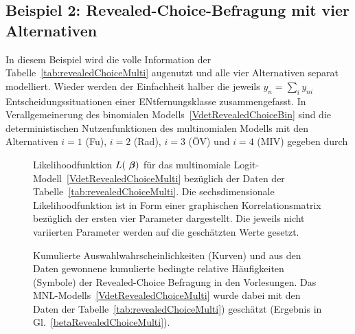 \subsection{\label{sec:revealedChoiceMulti}Beispiel 2:
  Revealed-Choice-Befragung mit vier Alternativen}

In diesem Beispiel wird die volle Information der
Tabelle~\ref{tab:revealedChoiceMulti} augenutzt und alle vier
Alternativen separat modelliert. Wieder werden der Einfachheit halber
die jeweils $y_n=\sum_i y_{ni}$ Entscheidungssituationen einer
ENtfernungsklasse zusammengefasst.
In Verallgemeinerung des binomialen Modells~\eqref{VdetRevealedChoiceBin}
sind die deterministischen Nutzenfunktionen des multinomialen Modells
mit den Alternativen $i=1$ (Fu\3), $i=2$ (Rad), $i=3$ (\"OV) und $i=4$
(MIV) gegeben durch

\begin{figure}
\caption{\label{fig:revealedChoiceMulti-L}Likelihoodfunktion $L({\mbox{ \boldmath {$\beta$}}})$
  f\"ur das multinomiale Logit-Modell~\eqref{VdetRevealedChoiceMulti} bez\"uglich
  der Daten der Tabelle~\ref{tab:revealedChoiceMulti}. Die
  sechsdimensionale Likelihoodfunktion ist in Form einer graphischen
  Korrelationsmatrix bez\"uglich der ersten vier Parameter
  dargestellt. Die jeweils nicht variierten Parameter werden auf die
  gesch\"atzten Werte gesetzt.
}
\end{figure}

\begin{figure}
\caption{\label{fig:revealedChoice-P1}Kumulierte Auswahlwahrscheinlichkeiten
  (Kurven) und aus den Daten gewonnene kumulierte bedingte
 relative H\"aufigkeiten (Symbole) der Revealed-Choice Befragung in
 den Vorlesungen. Das MNL-Modells~\eqref{VdetRevealedChoiceMulti} wurde
 dabei mit den Daten der Tabelle~\ref{tab:revealedChoiceMulti})
gesch\"atzt (Ergebnis in Gl.~\eqref{betaRevealedChoiceMulti}).
}
\end{figure}


